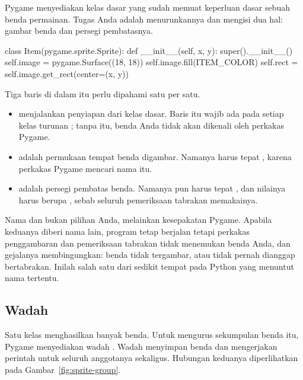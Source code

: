 Pygame menyediakan kelas dasar  yang sudah memuat
keperluan dasar sebuah benda permainan. Tugas Anda adalah menurunkannya dan
mengisi dua hal: gambar benda dan persegi pembatasnya.

\begin{kodekeluaran}
class Item(pygame.sprite.Sprite):
    def __init__(self, x, y):
        super().__init__()
        self.image = pygame.Surface((18, 18))
        self.image.fill(ITEM_COLOR)
        self.rect = self.image.get_rect(center=(x, y))
\end{kodekeluaran}

Tiga baris di dalam  itu perlu dipahami satu per satu.

\begin{itemize}
  \item {} menjalankan penyiapan dari kelas dasar.
        Baris itu wajib ada pada setiap kelas turunan ; tanpa
        itu, benda Anda tidak akan dikenali oleh perkakas Pygame.
  \item {} adalah permukaan tempat benda digambar. Namanya harus
        tepat , karena perkakas Pygame mencari nama itu.
  \item {} adalah persegi pembatas benda. Namanya pun harus tepat
        , dan nilainya harus berupa , sebab seluruh
        pemeriksaan tabrakan memakainya.
\end{itemize}

\begin{peringatanbox}
Nama  dan  bukan pilihan Anda, melainkan kesepakatan
Pygame. Apabila keduanya diberi nama lain, program tetap berjalan tetapi
perkakas penggambaran dan pemeriksaan tabrakan tidak menemukan benda Anda, dan
gejalanya membingungkan: benda tidak tergambar, atau tidak pernah dianggap
bertabrakan. Inilah salah satu dari sedikit tempat pada Python yang menuntut
nama tertentu.
\end{peringatanbox}

\subsection{Wadah }

Satu kelas menghasilkan banyak benda. Untuk mengurus sekumpulan benda itu,
Pygame menyediakan wadah . Wadah menyimpan benda dan
mengerjakan perintah untuk seluruh anggotanya sekaligus. Hubungan keduanya
diperlihatkan pada Gambar~\ref{fig:sprite-group}.


